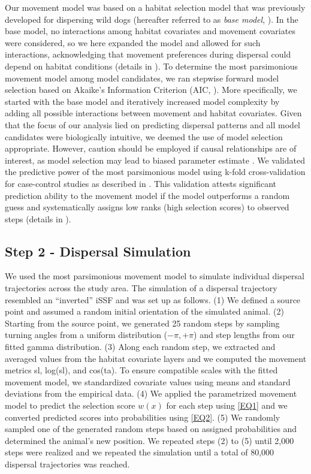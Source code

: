 \documentclass[../FinalThesis.tex]{subfiles}
\begin{document}
Our movement model was based on a habitat selection model that was previously
developed for dispersing wild dogs (hereafter referred to as \textit{base
model}, \citealp{Hofmann.2021}). In the base model, no interactions among
habitat covariates and movement covariates were considered, so we here expanded
the model and allowed for such interactions, acknowledging that movement
preferences during dispersal could depend on habitat conditions (details in
). To determine the most parsimonious movement model
among model candidates, we ran stepwise forward model selection based on
Akaike's Information Criterion (AIC, \citealp{Burnham.2002}). More specifically,
we started with the base model and iteratively increased model complexity by
adding all possible interactions between movement and habitat covariates. Given
that the focus of our analysis lied on predicting dispersal patterns and all
model candidates were biologically intuitive, we deemed the use of model
selection appropriate. However, caution should be employed if causal
relationships are of interest, as model selection may lead to biased parameter
estimate \citep{Whittingham.2006}. We validated the predictive power of the most
parsimonious model using k-fold cross-validation for case-control studies as
described in \citet{Fortin.2009}. This validation attests significant prediction
ability to the movement model if the model outperforms a random guess and
systematically assigns low ranks (high selection scores) to observed steps
(details in ).

\subsection{Step 2 - Dispersal Simulation}

We used the most parsimonious movement model to simulate individual dispersal
trajectories across the study area. The simulation of a dispersal trajectory
resembled an ``inverted'' iSSF and was set up as follows. (1) We defined a
source point and assumed a random initial orientation of the simulated animal.
(2) Starting from the source point, we generated 25 random steps by sampling
turning angles from a uniform distribution (\(-\pi, +\pi\)) and step lengths
from our fitted gamma distribution. (3) Along each random step, we extracted and
averaged values from the habitat covariate layers and we computed the movement
metrics \textsf{sl}, \textsf{log(sl)}, and \textsf{cos(ta)}. To ensure
compatible scales with the fitted movement model, we standardized covariate
values using means and standard deviations from the empirical data. (4) We
applied the parametrized movement model to predict the selection score \(w(x)\)
for each step using \ref{EQ1} and we converted predicted scores into
probabilities using \ref{EQ2}. (5) We randomly sampled one of the generated
random steps based on assigned probabilities and determined the animal's new
position. We repeated steps (2) to (5) until 2,000 steps were realized and we
repeated the simulation until a total of 80,000 dispersal trajectories was
reached.
\end{document}
